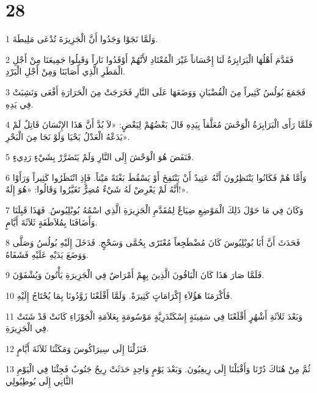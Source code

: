 \chapter{28}

\par 1 وَلَمَّا نَجَوْا وَجَدُوا أَنَّ الْجَزِيرَةَ تُدْعَى مَلِيطَةَ.
\par 2 فَقَدَّمَ أَهْلُهَا الْبَرَابِرَةُ لَنَا إِحْسَاناً غَيْرَ الْمُعْتَادِ لأَنَّهُمْ أَوْقَدُوا نَاراً وَقَبِلُوا جَمِيعَنَا مِنْ أَجْلِ الْمَطَرِ الَّذِي أَصَابَنَا وَمِنْ أَجْلِ الْبَرْدِ.
\par 3 فَجَمَعَ بُولُسُ كَثِيراً مِنَ الْقُضْبَانِ وَوَضَعَهَا عَلَى النَّارِ فَخَرَجَتْ مِنَ الْحَرَارَةِ أَفْعَى وَنَشِبَتْ فِي يَدِهِ.
\par 4 فَلَمَّا رَأَى الْبَرَابِرَةُ الْوَحْشَ مُعَلَّقاً بِيَدِهِ قَالَ بَعْضُهُمْ لِبَعْضٍ: «لاَ بُدَّ أَنَّ هَذَا الإِنْسَانَ قَاتِلٌ لَمْ يَدَعْهُ الْعَدْلُ يَحْيَا وَلَوْ نَجَا مِنَ الْبَحْرِ».
\par 5 فَنَفَضَ هُوَ الْوَحْشَ إِلَى النَّارِ وَلَمْ يَتَضَرَّرْ بِشَيْءٍ رَدِيءٍ.
\par 6 وَأَمَّا هُمْ فَكَانُوا يَنْتَظِرُونَ أَنَّهُ عَتِيدٌ أَنْ يَنْتَفِخَ أَوْ يَسْقُطَ بَغْتَةً مَيْتاً. فَإِذِ انْتَظَرُوا كَثِيراً وَرَأَوْا أَنَّهُ لَمْ يَعْرِضْ لَهُ شَيْءٌ مُضِرٌّ تَغَيَّرُوا وَقَالُوا: «هُوَ إِلَهٌ!».
\par 7 وَكَانَ فِي مَا حَوْلَ ذَلِكَ الْمَوْضِعِ ضِيَاعٌ لِمُقَدَّمِ الْجَزِيرَةِ الَّذِي اسْمُهُ بُوبْلِيُوسُ. فَهَذَا قَبِلَنَا وَأَضَافَنَا بِمُلاَطَفَةٍ ثَلاَثَةَ أَيَّامٍ.
\par 8 فَحَدَثَ أَنَّ أَبَا بُوبْلِيُوسَ كَانَ مُضْطَجِعاً مُعْتَرًى بِحُمَّى وَسَحْجٍ. فَدَخَلَ إِلَيْهِ بُولُسُ وَصَلَّى وَوَضَعَ يَدَيْهِ عَلَيْهِ فَشَفَاهُ.
\par 9 فَلَمَّا صَارَ هَذَا كَانَ الْبَاقُونَ الَّذِينَ بِهِمْ أَمْرَاضٌ فِي الْجَزِيرَةِ يَأْتُونَ وَيُشْفَوْنَ.
\par 10 فَأَكْرَمَنَا هَؤُلاَءِ إِكْرَامَاتٍ كَثِيرَةً. وَلَمَّا أَقْلَعْنَا زَوَّدُونَا بِمَا يُحْتَاجُ إِلَيْهِ.
\par 11 وَبَعْدَ ثَلاَثَةِ أَشْهُرٍ أَقْلَعْنَا فِي سَفِينَةٍ إِسْكَنْدَرِيَّةٍ مَوْسُومَةٍ بِعَلاَمَةِ الْجَوْزَاءِ كَانَتْ قَدْ شَتَتْ فِي الْجَزِيرَةِ.
\par 12 فَنَزَلْنَا إِلَى سِيرَاكُوسَ وَمَكَثْنَا ثَلاَثَةَ أَيَّامٍ.
\par 13 ثُمَّ مِنْ هُنَاكَ دُرْنَا وَأَقْبَلْنَا إِلَى رِيغِيُونَ. وَبَعْدَ يَوْمٍ وَاحِدٍ حَدَثَتْ رِيحٌ جَنُوبٌ فَجِئْنَا فِي الْيَوْمِ الثَّانِي إِلَى بُوطِيُولِي
